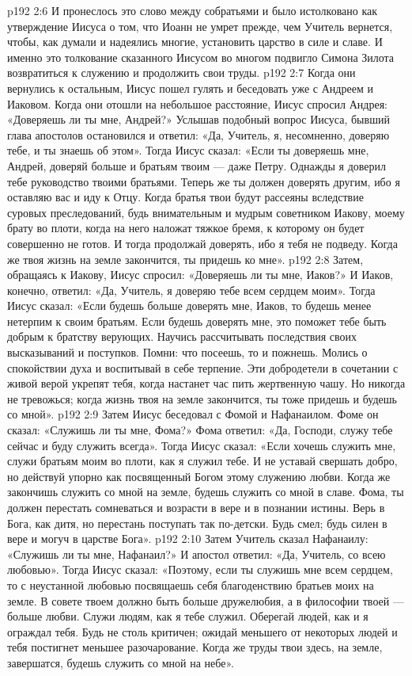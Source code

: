 \vs p192 2:6 \pc И пронеслось это слово между собратьями и было истолковано как утверждение Иисуса о том, что Иоанн не умрет прежде, чем Учитель вернется, чтобы, как думали и надеялись многие, установить царство в силе и славе. И именно это толкование сказанного Иисусом во многом подвигло Симона Зилота возвратиться к служению и продолжить свои труды.
\vs p192 2:7 \pc Когда они вернулись к остальным, Иисус пошел гулять и беседовать уже с Андреем и Иаковом. Когда они отошли на небольшое расстояние, Иисус спросил Андрея: «Доверяешь ли ты мне, Андрей?» Услышав подобный вопрос Иисуса, бывший глава апостолов остановился и ответил: «Да, Учитель, я, несомненно, доверяю тебе, и ты знаешь об этом». Тогда Иисус сказал: «Если ты доверяешь мне, Андрей, доверяй больше и братьям твоим --- даже Петру. Однажды я доверил тебе руководство твоими братьями. Теперь же ты должен доверять другим, ибо я оставляю вас и иду к Отцу. Когда братья твои будут рассеяны вследствие суровых преследований, будь внимательным и мудрым советником Иакову, моему брату во плоти, когда на него наложат тяжкое бремя, к которому он будет совершенно не готов. И тогда продолжай доверять, ибо я тебя не подведу. Когда же твоя жизнь на земле закончится, ты придешь ко мне».
\vs p192 2:8 Затем, обращаясь к Иакову, Иисус спросил: «Доверяешь ли ты мне, Иаков?» И Иаков, конечно, ответил: «Да, Учитель, я доверяю тебе всем сердцем моим». Тогда Иисус сказал: «Если будешь больше доверять мне, Иаков, то будешь менее нетерпим к своим братьям. Если будешь доверять мне, это поможет тебе быть добрым к братству верующих. Научись рассчитывать последствия своих высказываний и поступков. Помни: что посеешь, то и пожнешь. Молись о спокойствии духа и воспитывай в себе терпение. Эти добродетели в сочетании с живой верой укрепят тебя, когда настанет час пить жертвенную чашу. Но никогда не тревожься; когда жизнь твоя на земле закончится, ты тоже придешь и будешь со мной».
\vs p192 2:9 \pc Затем Иисус беседовал с Фомой и Нафанаилом. Фоме он сказал: «Служишь ли ты мне, Фома?» Фома ответил: «Да, Господи, служу тебе сейчас и буду служить всегда». Тогда Иисус сказал: «Если хочешь служить мне, служи братьям моим во плоти, как я служил тебе. И не уставай свершать добро, но действуй упорно как посвященный Богом этому служению любви. Когда же закончишь служить со мной на земле, будешь служить со мной в славе. Фома, ты должен перестать сомневаться и возрасти в вере и в познании истины. Верь в Бога, как дитя, но перестань поступать так по\hyp{}детски. Будь смел; будь силен в вере и могуч в царстве Бога».
\vs p192 2:10 Затем Учитель сказал Нафанаилу: «Служишь ли ты мне, Нафанаил?» И апостол ответил: «Да, Учитель, со всею любовью». Тогда Иисус сказал: «Поэтому, если ты служишь мне всем сердцем, то с неустанной любовью посвящаешь себя благоденствию братьев моих на земле. В совете твоем должно быть больше дружелюбия, а в философии твоей --- больше любви. Служи людям, как я тебе служил. Оберегай людей, как и я ограждал тебя. Будь не столь критичен; ожидай меньшего от некоторых людей и тебя постигнет меньшее разочарование. Когда же труды твои здесь, на земле, завершатся, будешь служить со мной на небе».
